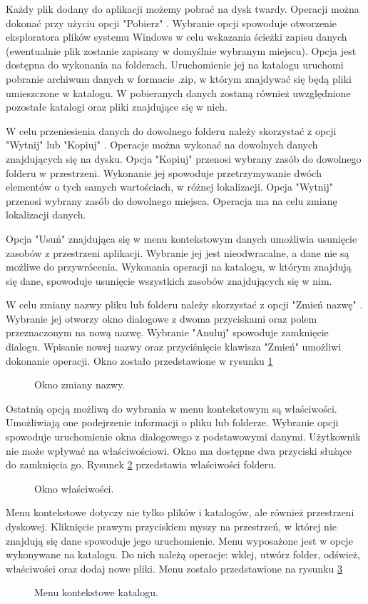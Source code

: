 Każdy plik dodany do aplikacji możemy pobrać na dysk twardy. Operacji można dokonać przy użyciu opcji "Pobierz" . Wybranie opcji spowoduje otworzenie eksploratora plików systemu Windows w celu wskazania ścieżki zapisu danych (ewentualnie plik zostanie zapisany w domyślnie wybranym miejscu). Opcja jest dostępna do wykonania na folderach. Uruchomienie jej na katalogu uruchomi pobranie archiwum danych w formacie .zip, w którym znajdywać się będą pliki umieszczone w katalogu. W pobieranych danych zostaną również uwzględnione pozostałe katalogi oraz pliki znajdujące się w nich.

W celu przeniesienia danych do dowolnego folderu należy skorzystać z opcji "Wytnij" lub "Kopiuj" . Operacje można wykonać na dowolnych danych znajdujących się na dysku. Opcja "Kopiuj" przenosi wybrany zasób do dowolnego folderu w przestrzeni. Wykonanie jej spowoduje przetrzymywanie dwóch elementów o tych samych wartościach, w różnej lokalizacji. Opcja "Wytnij" przenosi wybrany zasób do dowolnego miejsca. Operacja ma na celu zmianę lokalizacji danych.

Opcja "Usuń" znajdująca się w menu kontekstowym danych umożliwia usunięcie zasobów z przestrzeni aplikacji. Wybranie jej jest nieodwracalne, a dane nie są możliwe do przywrócenia. Wykonania operacji na katalogu, w którym znajdują się dane, spowoduje usunięcie wszystkich zasobów znajdujących się w nim.

W celu zmiany nazwy pliku lub folderu należy skorzystać z opcji "Zmień nazwę" . Wybranie jej otworzy okno dialogowe z dwoma przyciskami oraz polem przeznaczonym na nową nazwę. Wybranie "Anuluj" spowoduje zamknięcie dialogu. Wpisanie nowej nazwy oraz przyciśnięcie klawisza "Zmień" umożliwi dokonanie operacji. Okno zostało przedstawione w rysunku \ref{ChangeName}

\begin{figure}[!h]
	\centering
	\caption{Okno zmiany nazwy.}
	\label{ChangeName}
\end{figure}

Ostatnią opcją możliwą do wybrania w menu kontekstowym są właściwości. Umożliwiają one podejrzenie informacji o pliku lub folderze. Wybranie opcji spowoduje uruchomienie okna dialogowego z podstawowymi danymi. Użytkownik nie może wpływać na właściwościowi. Okno ma dostępne dwa przyciski służące do zamknięcia go. Rysunek \ref{descriptionWindow} przedstawia właściwości folderu.

\begin{figure}[!h]
	\centering
	\caption{Okno właściwości.}
	\label{descriptionWindow}
\end{figure}
\newpage
Menu kontekstowe dotyczy nie tylko plików i katalogów, ale również przestrzeni dyskowej. Kliknięcie prawym przyciskiem myszy na przestrzeń, w której nie znajdują się dane spowoduje jego uruchomienie. Menu wyposażone jest w opcje wykonywane na katalogu. Do nich należą operacje: wklej, utwórz folder, odśwież, właściwości oraz dodaj nowe pliki. Menu zostało przedstawione na rysunku \ref{DirectoryMenu}

\begin{figure}[!h]
	\centering
	\caption{Menu kontekstowe katalogu.}
	\label{DirectoryMenu}
\end{figure}


